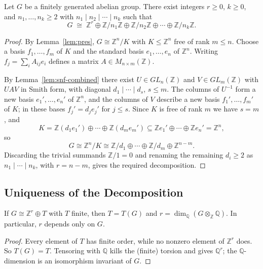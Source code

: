 \begin{proposition}
    \label{prop:existence}
    Let $G$ be a finitely generated abelian group. There exist integers
    $r \ge 0$, $k \ge 0$, and $n_1, \dots, n_k \ge 2$ with
    $n_1 \mid n_2 \mid \cdots \mid n_k$ such that
    \[
        G \;\cong\; \mathbb{Z}^r \oplus \mathbb{Z}/n_1\mathbb{Z} \oplus \mathbb{Z}/n_2\mathbb{Z}
        \oplus \cdots \oplus \mathbb{Z}/n_k\mathbb{Z}.
    \]
\end{proposition}
\begin{proof}
    By Lemma~\ref{lem:pres}, $G \cong \mathbb{Z}^n / K$ with $K \le \mathbb{Z}^n$ free of
    rank $m \le n$. Choose a basis $f_1, \dots, f_m$ of $K$ and the standard
    basis $e_1, \dots, e_n$ of $\mathbb{Z}^n$. Writing $f_j = \sum_i A_{ij} e_i$
    defines a matrix $A \in M_{n \times m}(\mathbb{Z})$.

    By Lemma~\ref{lem:snf-combined} there exist $U \in GL_n(\mathbb{Z})$ and
    $V \in GL_m(\mathbb{Z})$ with $U A V$ in Smith form, with diagonal
    $d_1 \mid \cdots \mid d_s$, $s \le m$. The columns of $U^{-1}$ form a new
    basis $e_1', \dots, e_n'$ of $\mathbb{Z}^n$, and the columns of $V$ describe a
    new basis $f_1', \dots, f_m'$ of $K$; in these bases $f_j' = d_j e_j'$ for
    $j \le s$. Since $K$ is free of rank $m$ we have $s = m$, and
    \[
        K = \mathbb{Z}(d_1 e_1') \oplus \cdots \oplus \mathbb{Z}(d_m e_m')
        \subseteq \mathbb{Z} e_1' \oplus \cdots \oplus \mathbb{Z} e_n' = \mathbb{Z}^n,
    \]
    so
    \[
        G \cong \mathbb{Z}^n / K \cong \mathbb{Z}/d_1 \oplus \cdots \oplus \mathbb{Z}/d_m
        \oplus \mathbb{Z}^{n - m}.
    \]
    Discarding the trivial summands $\mathbb{Z}/1 = 0$ and renaming the remaining
    $d_i \ge 2$ as $n_1 \mid \cdots \mid n_k$, with $r = n - m$, gives the
    required decomposition.
\end{proof}

\subsection{Uniqueness of the Decomposition}

\begin{lemma}
    \label{lem:rank}
    If $G \cong \mathbb{Z}^r \oplus T$ with $T$ finite, then $T = T(G)$ and
    $r = \dim_{\mathbb{Q}}(G \otimes_{\mathbb{Z}} \mathbb{Q})$. In particular, $r$ depends
    only on $G$.
\end{lemma}
\begin{proof}
    Every element of $T$ has finite order, while no nonzero element of $\mathbb{Z}^r$
    does. So $T(G) = T$. Tensoring with $\mathbb{Q}$ kills the (finite) torsion and
    gives $\mathbb{Q}^r$; the $\mathbb{Q}$-dimension is an isomorphism invariant of $G$.
\end{proof}


